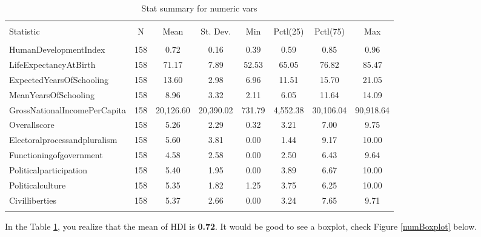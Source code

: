 \documentclass[a4paper, 12pt]{article}
\begin{document}
\begin{table}[!htbp] \centering 
  \caption{Stat summary for numeric vars} 
  \label{summaryNumeric} 
\scriptsize 
\begin{tabular}{@{\extracolsep{5pt}}lccccccc} 
\\[-1.8ex]\hline 
\hline \\[-1.8ex] 
Statistic & \multicolumn{1}{c}{N} & \multicolumn{1}{c}{Mean} & \multicolumn{1}{c}{St. Dev.} & \multicolumn{1}{c}{Min} & \multicolumn{1}{c}{Pctl(25)} & \multicolumn{1}{c}{Pctl(75)} & \multicolumn{1}{c}{Max} \\ 
\hline \\[-1.8ex] 
HumanDevelopmentIndex & 158 & 0.72 & 0.16 & 0.39 & 0.59 & 0.85 & 0.96 \\ 
LifeExpectancyAtBirth & 158 & 71.17 & 7.89 & 52.53 & 65.05 & 76.82 & 85.47 \\ 
ExpectedYearsOfSchooling & 158 & 13.60 & 2.98 & 6.96 & 11.51 & 15.70 & 21.05 \\ 
MeanYearsOfSchooling & 158 & 8.96 & 3.32 & 2.11 & 6.05 & 11.64 & 14.09 \\ 
GrossNationalIncomePerCapita & 158 & 20,126.60 & 20,390.02 & 731.79 & 4,552.38 & 30,106.04 & 90,918.64 \\ 
Overallscore & 158 & 5.26 & 2.29 & 0.32 & 3.21 & 7.00 & 9.75 \\ 
Electoralprocessandpluralism & 158 & 5.60 & 3.81 & 0.00 & 1.44 & 9.17 & 10.00 \\ 
Functioningofgovernment & 158 & 4.58 & 2.58 & 0.00 & 2.50 & 6.43 & 9.64 \\ 
Politicalparticipation & 158 & 5.40 & 1.95 & 0.00 & 3.89 & 6.67 & 10.00 \\ 
Politicalculture & 158 & 5.35 & 1.82 & 1.25 & 3.75 & 6.25 & 10.00 \\ 
Civilliberties & 158 & 5.37 & 2.66 & 0.00 & 3.24 & 7.65 & 9.71 \\ 
\hline \\[-1.8ex] 
\end{tabular} 
\end{table} 
In the Table \ref{summaryNumeric}, you realize that the mean of HDI is {\bf0.72}. It would be good to see a boxplot, check Figure \ref{numBoxplot} below.
\end{document}
